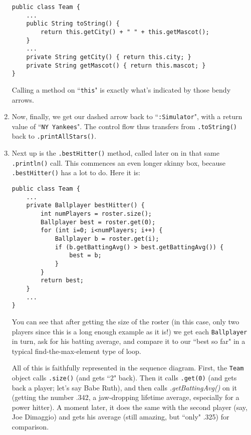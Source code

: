 \begin{enumerate}
\begin{Verbatim}[fontsize=\footnotesize,samepage=true,frame=single]
public class Team {
    ...
    public String toString() {
        return this.getCity() + " " + this.getMascot();
    }
    ...
    private String getCity() { return this.city; }
    private String getMascot() { return this.mascot; }
}
\end{Verbatim}

Calling a method on ``\texttt{this}" is exactly what's indicated by those
bendy arrows.

\item Now, finally, we get our dashed arrow back to ``\texttt{:Simulator}",
with a return value of ``\texttt{NY Yankees}". The control flow thus transfers
from \texttt{.toString()} back to \texttt{.printAllStars()}.

\item Next up is the \texttt{.bestHitter()} method, called later on in that
same \texttt{.println()} call. This commences an even longer skinny box,
because \texttt{.bestHitter()} has a lot to do. Here it is:

\begin{Verbatim}[fontsize=\scriptsize,samepage=true,frame=single]
public class Team {
    ...
    private Ballplayer bestHitter() {
        int numPlayers = roster.size();
        Ballplayer best = roster.get(0);
        for (int i=0; i<numPlayers; i++) {
            Ballplayer b = roster.get(i);
            if (b.getBattingAvg() > best.getBattingAvg()) {
                best = b;
            }
        }
        return best;
    }
    ...
}
\end{Verbatim}

You can see that after getting the size of the roster (in this case, only two
players since this is a long enough example as it is!) we get each
\texttt{Ballplayer} in turn, ask for his batting average, and compare it to
our ``best so far" in a typical find-the-max-element type of loop.

All of this is faithfully represented in the sequence diagram. First, the
\texttt{Team} object calls \texttt{.size()} (and gets ``2" back). Then it
calls \texttt{.get(0)} (and gets back a player; let's say Babe Ruth), and then
calls \textit{.getBattingAvg()} on it (getting the number .342, a jaw-dropping
lifetime average, especially for a power hitter). A moment later, it does the
same with the second player (say, Joe Dimaggio) and gets his average (still
amazing, but ``only" .325) for comparison.


\end{enumerate}
